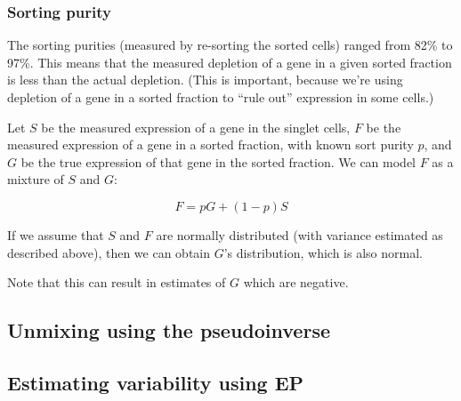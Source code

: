 \documentclass{article}
\begin{document}
\subsubsection*{Sorting purity}

The sorting purities (measured by re-sorting the sorted cells) ranged from 82\% to 97\%.
This means that the measured depletion of a gene in a given sorted fraction is less than
the actual depletion. (This is important, because we're using depletion of a gene in a
sorted fraction to ``rule out'' expression in some cells.)

Let $S$ be the measured expression of a gene in the singlet cells,
$F$ be the
measured expression of a gene in a sorted fraction, with known sort purity $p$, and
$G$ be the true expression of that gene in the sorted fraction.
We can model $F$ as a mixture of $S$ and $G$:

\[
F = pG + (1-p)S
\]

If we assume that $S$ and $F$ are normally distributed (with variance estimated as described
above), then we can obtain $G$'s distribution, which is also normal.

Note that this can result in estimates of $G$ which are negative.


\subsection*{Unmixing using the pseudoinverse}





\subsection*{Estimating variability using EP}
\end{document}
